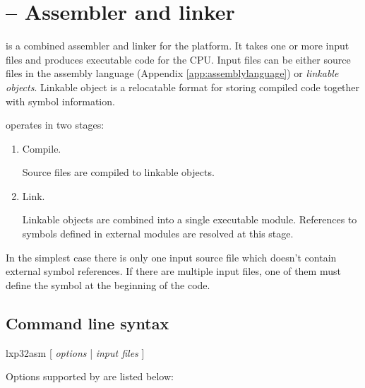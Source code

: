 \documentclass[a4paper,12pt,twoside,extrafontsizes]{memoir}
\begin{document}
\section{ -- Assembler and linker}
\label{sec:lxp32asm}

 is a combined assembler and linker for the \lxp{} platform. It takes one or more input files and produces executable code for the CPU. Input files can be either source files in the \lxp{} assembly language (Appendix \ref{app:assemblylanguage}) or \emph{linkable objects}. Linkable object is a relocatable format for storing compiled \lxp{} code together with symbol information.

 operates in two stages:

\begin{enumerate}
	\item Compile.
	
	Source files are compiled to linkable objects.
	
	\item Link.
	
	Linkable objects are combined into a single executable module. References to symbols defined in external modules are resolved at this stage.
\end{enumerate}

In the simplest case there is only one input source file which doesn't contain external symbol references. If there are multiple input files, one of them must define the  symbol at the beginning of the code.

\subsection{Command line syntax}

\begin{codepar}
    lxp32asm [ \emph{options} | \emph{input files} ]
\end{codepar}

Options supported by  are listed below:
\end{document}
